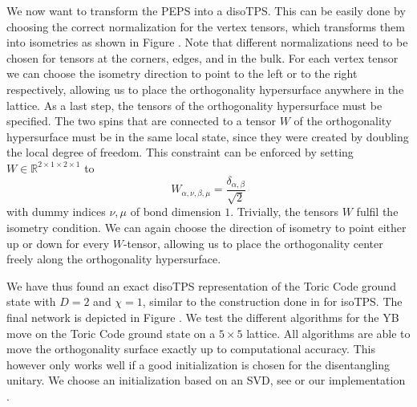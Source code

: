 We now want to transform the PEPS into a disoTPS. This can be easily done by choosing the correct normalization for the vertex tensors, which transforms them into isometries as shown in Figure . Note that different normalizations need to be chosen for tensors at the corners, edges, and in the bulk. For each vertex tensor we can choose the isometry direction to point to the left or to the right respectively, allowing us to place the orthogonality hypersurface anywhere in the lattice. As a last step, the tensors of the orthogonality hypersurface must be specified. The two spins that are connected to a tensor $W$ of the orthogonality hypersurface must be in the same local state, since they were created by doubling the local degree of freedom. This constraint can be enforced by setting $W\in\mathbb{R}^{2\times1\times2\times1}$ to
\begin{equation}
	W_{\alpha,\nu,\beta,\mu} = \frac{\delta_{\alpha,\beta}}{\sqrt{2}}
\end{equation} 
with dummy indices $\nu, \mu$ of bond dimension $1$. Trivially, the tensors $W$ fulfil the isometry condition. We can again choose the direction of isometry to point either up or down for every $W$-tensor, allowing us to place the orthogonality center freely along the orthogonality hypersurface.\par
We have thus found an exact disoTPS representation of the Toric Code ground state with $D = 2$ and $\chi= 1$, similar to the construction done in \cite{cite:isometric_tensor_network_representation_of_string_net_liquids} for isoTPS. The final network is depicted in Figure . We test the different algorithms for the YB move on the Toric Code ground state on a $5\times5$ lattice. All algorithms are able to move the orthogonality surface exactly up to computational accuracy. This however only works well if a good initialization is chosen for the disentangling unitary. We choose an initialization based on an SVD, see \cite{cite:isometric_tensor_network_states_in_two_dimensions, cite:efficient_simulation_of_dynamics_in_two_dimensional_quantum_spin_systems} or our implementation \cite{cite:github_YB_isoTPS}.
